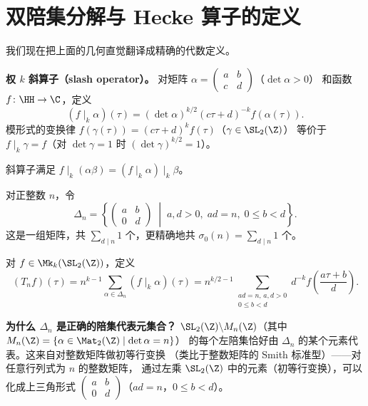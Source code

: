 \section{双陪集分解与 Hecke 算子的定义}
\label{sec:double-coset}

我们现在把上面的几何直觉翻译成精确的代数定义。

\textbf{权 $k$ 斜算子（slash operator）。}
对矩阵 $\alpha = \begin{pmatrix} a & b \\ c & d \end{pmatrix}$（$\det\alpha > 0$）
和函数 $f\colon \HH \to \C$，定义
\[
  (f \mid_k \alpha)(\tau) = (\det\alpha)^{k/2}(c\tau + d)^{-k} f(\alpha(\tau)).
\]
模形式的变换律 $f(\gamma(\tau)) = (c\tau+d)^k f(\tau)$（$\gamma \in \SL_2(\Z)$）
等价于 $f \mid_k \gamma = f$（对 $\det\gamma = 1$ 时 $(\det\gamma)^{k/2} = 1$）。

斜算子满足 $f \mid_k (\alpha\beta) = (f \mid_k \alpha) \mid_k \beta$。

\begin{definition}
\label{def:hecke-operator-full}
对正整数 $n$，令
\[
  \Delta_n = \left\{
    \begin{pmatrix} a & b \\ 0 & d \end{pmatrix}
    \;\middle|\; a, d > 0,\; ad = n,\; 0 \leq b < d
  \right\}.
\]
这是一组矩阵，共 $\sum_{d \mid n} 1$ 个，更精确地共 $\sigma_0(n) = \sum_{d \mid n} 1$ 个。

对 $f \in \Mk_k(\SL_2(\Z))$，定义
\[
  (T_n f)(\tau) = n^{k-1} \sum_{\alpha \in \Delta_n} (f \mid_k \alpha)(\tau)
  = n^{k/2-1} \sum_{\substack{ad=n,\, a,d>0 \\ 0 \leq b < d}}
    d^{-k} f\!\left(\frac{a\tau + b}{d}\right).
\]
\end{definition}



\textbf{为什么 $\Delta_n$ 是正确的陪集代表元集合？}
$\SL_2(\Z) \backslash M_n(\Z)$（其中 $M_n(\Z) = \{\alpha \in \Mat_2(\Z) \mid \det\alpha = n\}$）
的每个左陪集恰好由 $\Delta_n$ 的某个元素代表。这来自对整数矩阵做初等行变换
（类比于整数矩阵的 Smith 标准型）——对任意行列式为 $n$ 的整数矩阵，
通过左乘 $\SL_2(\Z)$ 中的元素（初等行变换），可以化成上三角形式
$\begin{pmatrix} a & b \\ 0 & d \end{pmatrix}$（$ad = n$，$0 \leq b < d$）。


